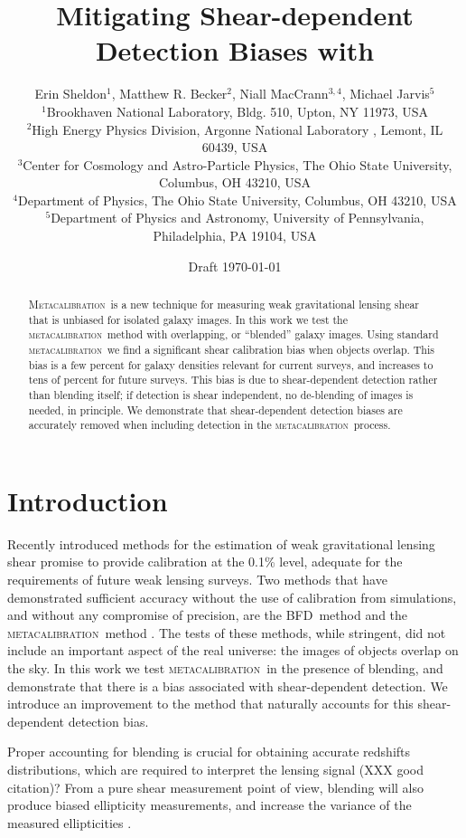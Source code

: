 \documentclass[fleqn,useAMS,usenatbib]{mnras}
\title[Metadetection]{Mitigating Shear-dependent Detection Biases with \Mcal}
\author[Sheldon et~al.]{Erin Sheldon$^1$, Matthew R. Becker$^2$,
Niall MacCrann$^{3,4}$, Michael Jarvis$^5$
  \\$^1$Brookhaven National Laboratory, Bldg. 510, Upton, NY 11973, USA
  \\$^2$High Energy Physics Division, Argonne National Laboratory , Lemont, IL 60439, USA
  \\$^3$Center for Cosmology and Astro-Particle Physics, The Ohio State University, Columbus, OH 43210, USA
  \\$^4$Department of Physics, The Ohio State University, Columbus, OH 43210, USA
  \\$^5$Department of Physics and Astronomy, University of Pennsylvania, Philadelphia, PA 19104, USA
}
\newcommand{\mcal}{\textsc{metacalibration}}
\newcommand{\Mcal}{\textsc{Metacalibration}}
\newcommand{\bfd}{\textsc{BFD}}
\begin{document}
\date{Draft \today}
\maketitle

\begin{abstract}

\Mcal\ is a new technique for measuring weak gravitational lensing shear that
is unbiased for isolated galaxy images.  In this work we test the \mcal\ method
with overlapping, or ``blended'' galaxy images.  Using standard \mcal\ we find
a significant shear calibration bias when objects overlap. This bias is a few
percent for galaxy densities relevant for current surveys, and increases to
tens of percent for future surveys.  This bias is due to shear-dependent
detection rather than blending itself; if detection is shear independent, no
de-blending of images is needed, in principle.  We demonstrate that
shear-dependent detection biases are accurately removed when including
detection in the \mcal\ process.

\end{abstract}

\section{Introduction}


Recently introduced methods for the estimation of weak gravitational lensing
shear promise to provide calibration at the 0.1\% level, adequate for the
requirements of future weak lensing surveys.  Two methods that have
demonstrated sufficient accuracy without the use of calibration from
simulations, and without any compromise of precision, are the \bfd\ method
\citep{BernBFD2016} and the \mcal\ method \citep{HuffMcal2017,SheldonMcal2017}.
The tests of these methods, while stringent, did not include an important
aspect of the real universe: the images of objects overlap on the sky. In this
work we test \mcal\ in the presence of blending, and demonstrate that there is
a bias associated with shear-dependent detection.  We introduce an improvement
to the method that naturally accounts for this shear-dependent detection bias.

Proper accounting for blending is crucial for obtaining accurate redshifts
distributions, which are required to interpret the lensing signal (XXX good
citation)?  From a pure shear measurement point of view, blending will also
produce biased ellipticity measurements, and increase the variance of the
measured ellipticities \citep{DawsonBlending2016}.
\end{document}
